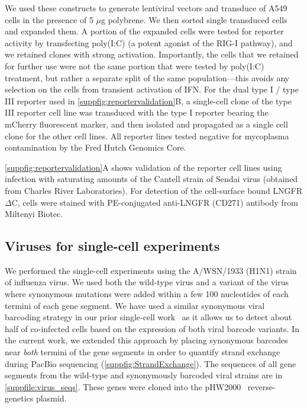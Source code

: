 \documentclass[10pt,letterpaper]{article}
\newcommand{\SUPPFILE}[1]{\autoref{suppfile:#1}}
\newcommand{\SUPPFIG}[1]{\autoref{suppfig:#1}}
\begin{document}
We used these constructs to generate lentiviral vectors and transduce of A549 cells in the presence of 5 $\mu$g polybrene.
We then sorted single transduced cells and expanded them.
A portion of the expanded cells were tested for reporter activity by transfecting poly(I:C) (a potent agonist of the RIG-I pathway), and we retained clones with strong activation.
Importantly, the cells that we retained for further use were not the same portion that were tested by poly(I:C) treatment, but rather a separate split of the same population---this avoids any selection on the cells from transient activation of IFN.
For the dual type I / type III reporter used in \SUPPFIG{reportervalidation}B, a single-cell clone of the type III reporter cell line was transduced with the type I reporter bearing the mCherry fluorescent marker, and then isolated and propagated as a single cell clone for the other cell lines.
All reporter lines tested negative for mycoplasma contamination by the Fred Hutch Genomics Core.

\SUPPFIG{reportervalidation}A shows validation of the reporter cell lines using infection with saturating amounts of the Cantell strain of Sendai virus (obtained from Charles River Laboratories).
For detection of the cell-surface bound LNGFR$\Delta$C, cells were stained with PE-conjugated anti-LNGFR (CD271) antibody from Miltenyi Biotec.

\subsection*{Viruses for single-cell experiments}
We performed the single-cell experiments using the A/WSN/1933 (H1N1) strain of influenza virus.
We used both the wild-type virus and a variant of the virus where synonymous mutations were added within a few 100 nucleotides of each termini of each gene segment.
We have used a similar synonymous viral barcoding strategy in our prior single-cell work~\cite{russell2018extreme} as it allows us to detect about half of co-infected cells based on the expression of both viral barcode variants.
In the current work, we extended this approach by placing synonymous barcodes near \emph{both} termini of the gene segments in order to quantify strand exchange during PacBio sequencing (\SUPPFIG{StrandExchange}).
The sequences of all gene segments from the wild-type and synonymously barcoded viral strains are in \SUPPFILE{virus_seqs}.
These genes were cloned into the pHW2000~\cite{hoffmann2000dna} reverse-genetics plasmid.
\end{document}
